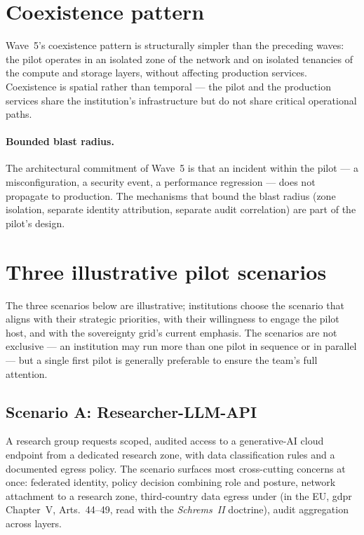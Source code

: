 \section{Coexistence pattern}
\label{sec:w5-coexistence}

Wave~5's coexistence pattern is structurally simpler than the
preceding waves: the pilot operates in an isolated zone of the
network and on isolated tenancies of the compute and storage
layers, without affecting production services. Coexistence is
spatial rather than temporal --- the pilot and the production
services share the institution's infrastructure but do not share
critical operational paths.

\paragraph{Bounded blast radius.} The architectural commitment of
Wave~5 is that an incident within the pilot --- a misconfiguration,
a security event, a performance regression --- does not propagate
to production. The mechanisms that bound the blast radius (zone
isolation, separate identity attribution, separate audit
correlation) are part of the pilot's design.

\section{Three illustrative pilot scenarios}
\label{sec:w5-scenarios}

The three scenarios below are illustrative; institutions choose
the scenario that aligns with their strategic priorities, with
their willingness to engage the pilot host, and with the
sovereignty grid's current emphasis. The scenarios are not
exclusive --- an institution may run more than one pilot in
sequence or in parallel --- but a single first pilot is generally
preferable to ensure the team's full attention.

\subsection{Scenario A: Researcher-LLM-API}
\label{sec:w5-scenario-llm}

A research group requests scoped, audited access to a
generative-AI cloud endpoint from a dedicated research zone, with
data classification rules and a documented egress policy. The
scenario surfaces most cross-cutting concerns at once: federated
identity, policy decision combining role and posture, network
attachment to a research zone, third-country data egress under
 (in the EU, \gls{gdpr}
Chapter~V, Arts.~44--49, read with the \emph{Schrems~II} doctrine),
audit
aggregation across layers.

